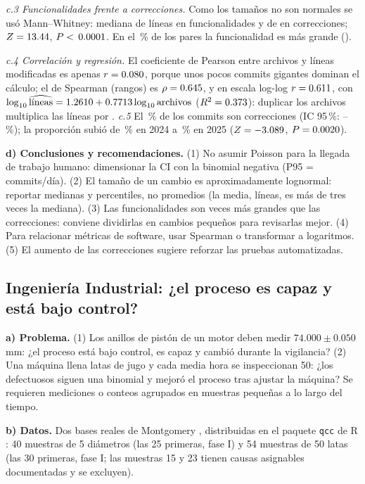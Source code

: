 \documentclass[11pt]{article}
\begin{document}
\emph{c.3 Funcionalidades frente a correcciones.} Como los tamaños no son normales se usó Mann–Whitney: mediana de
\cfMf{} líneas en \cfNf{} funcionalidades y de \cfMc{} en \cfNc{} correcciones; $Z=13.44$, $P<\,0.0001$. En el \cfSup\,\%
de los pares la funcionalidad es más grande (\rechaza).

\emph{c.4 Correlación y regresión.} El coeficiente de Pearson entre archivos y líneas modificadas es apenas
$r=0.080$, porque unos pocos commits gigantes dominan el cálculo; el de Spearman (rangos) es $\rho=0.645$, y en escala
log-log $r=0.611$, con $\log_{10}\widehat{\text{líneas}}=1.2610+0.7713\log_{10}\text{archivos}$
($R^2=0.373$): duplicar los archivos multiplica las líneas por \arDoble. \emph{c.5} El \pcTot\,\% de los commits son
correcciones (IC 95\,\%: \pcLi–\pcLs\,\%); la proporción subió de \pcUno\,\% en 2024 a \pcDos\,\% en 2025
($Z=-3.089$, $P=0.0020$).

\begin{lectura}
\textbf{d) Conclusiones y recomendaciones.} (1) No asumir Poisson para la llegada de trabajo humano: dimensionar la
CI con la binomial negativa (P95 = \pnBn{} commits/día). (2) El tamaño de un cambio es aproximadamente lognormal:
reportar medianas y percentiles, no promedios (la media, \tamMedia{} líneas, es más de tres veces la mediana). (3) Las funcionalidades son
\cfRazon{} veces más grandes que las correcciones: conviene dividirlas en cambios pequeños para revisarlas mejor.
(4) Para relacionar métricas de software, usar Spearman o transformar a logaritmos. (5) El aumento de las
correcciones sugiere reforzar las pruebas automatizadas.
\end{lectura}

\subsection{Ingeniería Industrial: ¿el proceso es capaz y está bajo control?}
\textbf{a) Problema.} (1) Los anillos de pistón de un motor deben medir $74.000\pm0.050$ mm: ¿el proceso está bajo
control, es capaz y cambió durante la vigilancia? (2) Una máquina llena latas de jugo y cada media hora se
inspeccionan 50: ¿los defectuosos siguen una binomial y mejoró el proceso tras ajustar la máquina? Se requieren
mediciones o conteos agrupados en muestras pequeñas a lo largo del tiempo.

\textbf{b) Datos.} Dos bases reales de Montgomery \cite{montgomeryqc}, distribuidas en el paquete \texttt{qcc} de R
\cite{qcc}: 40 muestras de 5 diámetros (las 25 primeras, fase I) y 54 muestras de 50 latas (las 30 primeras, fase I;
las muestras 15 y 23 tienen causas asignables documentadas y se excluyen).
\end{document}
